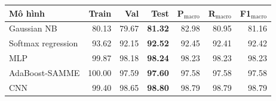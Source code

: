 \begin{tabular}{lrrrrrr}
\toprule
Mô hình & Train & Val & Test & P$_{\text{macro}}$ & R$_{\text{macro}}$ & F1$_{\text{macro}}$ \\
\midrule
Gaussian NB & 80.13 & 79.67 & \textbf{81.32} & 82.98 & 80.95 & 81.16 \\
Softmax regression & 93.62 & 92.15 & \textbf{92.52} & 92.45 & 92.41 & 92.42 \\
MLP & 99.87 & 98.18 & \textbf{98.24} & 98.23 & 98.23 & 98.23 \\
AdaBoost-SAMME & 100.00 & 97.59 & \textbf{97.60} & 97.58 & 97.58 & 97.58 \\
CNN & 99.40 & 98.65 & \textbf{98.80} & 98.79 & 98.79 & 98.79 \\
\bottomrule
\end{tabular}
